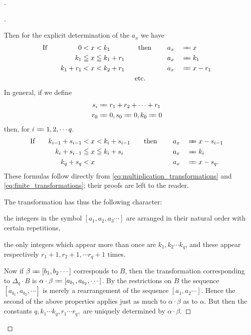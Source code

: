 \documentclass[10pt, twoside]{extarticle}
\def\varequals#1{\mathrel{\leaders\hbox to3pt{$=$\hss}\hskip#1=}}
\newcommand\longeq{\varequals{0.4em}}
\theoremstyle{breaktheorem}
\theoremstyle{mylemma}
\theoremstyle{mydefinition}
\theoremstyle{mycorollary}
\newenvironment{proofnewlineindent}[1][\proofname]{%
  \begin{proof}[\indent#1]$ $\par\nobreak\ignorespaces
}{%
  \end{proof}
}
\begin{document}
\begin{proofnewlineindent}
\begin{proofnewlineindent}
  Then for the explicit determination of the \(a_x\) we have
  \begin{alignat*}{5}
    \text{If\quad} && 0 &< x < k_1           && \text{\quad then \quad} && a_x&&\longeq x \\
             && k_1 &\leqq x \leqq k_1 + r_1 &&                         &&a_x &&\longeq k_1 \\
           && k_1 + r_1 &< x < k_2 + r_1     &&                         &&a_x&&\longeq x-r_1 \\
           &&           &                    &&\text{\enskip etc.}      &&   &&
  \end{alignat*}
  In general, if we define
  \begin{align*}
    s_i &\longeq r_1 + r_2 + \cdots + r_1 \\
    r_0 &\longeq 0, s_0 \longeq 0, k_0 \longeq 0
  \end{align*}
  then, for \(i \longeq 1, 2, \cdots q\).
  \begin{alignat*}{5}
    \text{If\quad} && k_{i-1}+s_{i-1} &< x < k_i +s_{i-1}           && \text{\quad then \quad} && a_x&&\longeq x-s_{i-1} \\
             && k_i +s_{i-1} &\leqq x \leqq k_i + s_i &&                         &&a_x &&\longeq k_i \\
           && k_q +s_q &< x  &&                         &&a_x&&\longeq x-s_q.
  \end{alignat*}
  These formulas follow directly from \eqref{eq:multiplication_transformations} and \eqref{eq:finite_transformations}; their proofs are left to
  the reader.

  The transformation has thus the following character: \begin{enumerate*}[label=\arabic*)] \item the integers in the symbol \([a_1, a_2, a_3 \cdots]\) are arranged in their natural order with certain
    repetitions, \item the only integers which appear more than once are \(k_1, k_2 \cdots k_q\),
    and these appear respectively \(r_1 +1, r_2 +1, \cdots r_q +1\) times.
  \end{enumerate*}

  Now if  \(\beta \longeq [b_1, b_2 \cdots]\) corresponds to \(B\), then the transformation
  corresponding to \(\Delta_q \cdot B\) is \(\alpha \cdot \beta \longeq [a_{b_1}, a_{b_2}, \cdots]\). By the restrictions on \(B\)
  the sequence \([a_{b_1}, a_{b_2}, \cdots]\) is merely a rearrangement of the sequence
  \([a_1, a_2 \cdots]\). Hence the second of the above properties applies just as much
  to \(\alpha \cdot \beta\) as to \(\alpha\). But then the constants \(q, k_1 \cdots k_q, r_1 \cdots r_q,\) are uniquely
  determined by \(\alpha \cdot \beta\).
\end{proofnewlineindent}


\end{proofnewlineindent}
\end{document}
